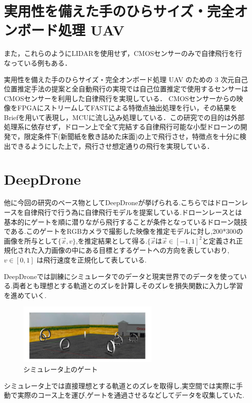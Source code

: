 \section{実用性を備えた手のひらサイズ・完全オンボード処理 UAV}
また，これらのようにLIDARを使用せず，CMOSセンサーのみで自律飛行を行なっている例もある．

実用性を備えた手のひらサイズ・完全オンボード処理 UAV のための 3 次元自己位置推定手法の提案と全自動飛行の実現では自己位置推定で使用するセンサーはCMOSセンサーを利用した自律飛行を実現している．
CMOSセンサーからの映像をFPGAにストリームしてFASTによる特徴点抽出処理を行い，その結果をBriefを用いて表現し，MCUに流し込み処理している．この研究での目的は外部処理系に依存せず，ドローン上で全て完結する自律飛行可能な小型ドローンの開発で，限定条件下(新聞紙を敷き詰めた床面)の上で飛行させ，特徴点を十分に検出できるようにした上で，飛行させ想定通りの飛行を実現している．

\section{DeepDrone}
他に今回の研究のベース物としてDeepDroneが挙げられる.こちらではドローンレースを自律飛行で行う為に自律飛行モデルを提案している.ドローンレースとは基本的にゲートを順に潜りながら飛行することが条件となっているドローン競技である.このゲートをRGBカメラで撮影した映像を推定モデルに対し,200*300の画像を所与として$\lbrace \vec{x}, v \rbrace$,を推定結果として得る.$\lbrace \vec{x}$は$\vec{x} \in [-1,1]^2$と定義され正規化された入力画像の中にある目標とするゲートへの方向を表していおり, $v \in [0,1]$ は飛行速度を正規化して表している. 

DeepDroneでは訓練にシミュレータでのデータと現実世界でのデータを使っている.両者とも理想とする軌道とのズレを計算しそのズレを損失関数に入力し学習を進めていく.
\begin{figure}[htbp]
  \begin{center}
    \includegraphics[clip,width=7.0cm]{img/deep-simu.png}
    \caption{シミュレータ上のゲート}
    \label{fig:gate}
  \end{center}
\end{figure}
シミュレータ上では直接理想とする軌道とのズレを取得し,実空間では実際に手動で実際のコース上を運び,ゲートを通過させるなどしてデータを収集していた.

